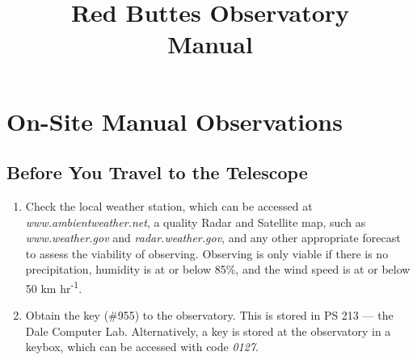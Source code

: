 \documentclass[letterpaper,12pt]{article}
\title{Red Buttes Observatory\\
	Manual }
\author{}
\begin{document}
\maketitle
\section{On-Site Manual Observations}
	\subsection{Before You Travel to the Telescope}
	\begin{enumerate}
		\item Check the local weather station, which can be accessed at \textit{www.ambientweather.net}, a quality Radar and Satellite map, such as \textit{www.weather.gov} and \textit{radar.weather.gov}, and any other appropriate forecast to assess the viability of observing. Observing is only viable if there is no precipitation, humidity is at or below 85\%, and the wind speed is at or below 50 km hr\textsuperscript{-1}.
		\item Obtain the key (\#955) to the observatory. This is stored in PS 213 --- the Dale Computer Lab. Alternatively, a key is stored at the observatory in a keybox, which can be accessed with code \textit{0127}.
	\end{enumerate}
	
\end{document}
